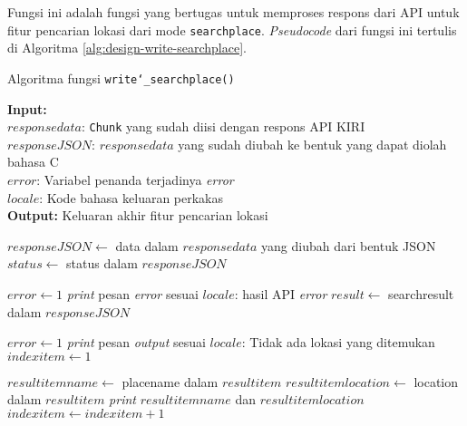 Fungsi ini adalah fungsi yang bertugas untuk memproses respons dari API untuk fitur pencarian lokasi dari mode \verb|searchplace|. \textit{Pseudocode} dari fungsi ini tertulis di Algoritma \ref{alg:design-write-searchplace}.

\begin{algorithm}[h]
	\caption{\textendash\xspace Algoritma fungsi \texttt{write\char`_searchplace()}}
	\label{alg:design-write-searchplace}
	\vspace{-0.6\baselineskip}
	\begin{flushleft}
		\textbf{Input:} \\
		\hspace{1.1em}\textendash\xspace $responsedata$: \texttt{Chunk} yang sudah diisi dengan respons API KIRI \\
		\hspace{1.1em}\textendash\xspace $responseJSON$: $responsedata$ yang sudah diubah ke bentuk yang dapat diolah bahasa C \\
		\hspace{1.1em}\textendash\xspace $error$: Variabel penanda terjadinya \textit{error} \\
		\hspace{1.1em}\textendash\xspace $locale$: Kode bahasa keluaran perkakas \\
		\textbf{Output:} Keluaran akhir fitur pencarian lokasi \\
	\end{flushleft}
	\vspace{-1.05\baselineskip}
	\begin{algorithmic}
		\State $responseJSON \gets$ data dalam $responsedata$ yang diubah dari bentuk JSON
		\State $status \gets$ \textquotesingle\textquotesingle status\textquotesingle\textquotesingle\xspace dalam $responseJSON$
		
			\State $error \gets 1$
			\State \textit{print} pesan \textit{error} sesuai $locale$: hasil API \textit{error}
		\Else
			\State $result \gets$ \textquotesingle\textquotesingle searchresult\textquotesingle\textquotesingle\xspace dalam $responseJSON$
			
				\State $error \gets 1$
				\State \textit{print} pesan \textit{output} sesuai $locale$: Tidak ada lokasi yang ditemukan
			\Else
				\State $indexitem \gets 1$
				
				 
					\State $resultitemname \gets$ \textquotesingle\textquotesingle placename\textquotesingle\textquotesingle\xspace dalam $resultitem$
					\State $resultitemlocation \gets$ \textquotesingle\textquotesingle location\textquotesingle\textquotesingle\xspace dalam $resultitem$
					\State \textit{print} $resultitemname$ dan $resultitemlocation$
					\State $indexitem \gets indexitem + 1$
				\EndFor
			\EndIf
		\EndIf
	\end{algorithmic}
\end{algorithm}
	
